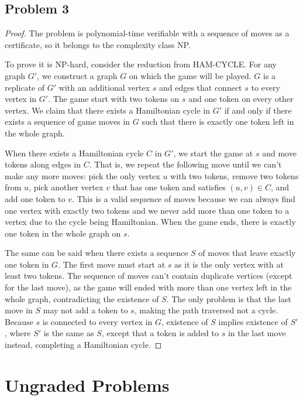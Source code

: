 \documentclass{article}
\begin{document}
\subsection*{Problem 3}

\begin{proof}
    The problem is polynomial-time verifiable with a sequence of moves as a certificate, so it belongs to the complexity class NP.
    
    To prove it is NP-hard, consider the reduction from HAM-CYCLE. For any graph $G'$, we construct a graph $G$ on which the game will be played. $G$ is a replicate of $G'$ with an additional vertex $s$ and edges that connect $s$ to every vertex in $G'$. The game start with two tokens on $s$ and one token on every other vertex. We claim that there exists a Hamiltonian cycle in $G'$ if and only if there exists a sequence of game moves in $G$ such that there is exactly one token left in the whole graph.

    When there exists a Hamiltonian cycle $C$ in $G'$, we start the game at $s$ and move tokens along edges in $C$. That is, we repeat the following move until we can't make any more moves: pick the only vertex $u$ with two tokens, remove two tokens from $u$, pick another vertex $v$ that has one token and satisfies $(u, v) \in C$, and add one token to $v$. This is a valid sequence of moves because we can always find one vertex with exactly two tokens and we never add more than one token to a vertex due to the cycle being Hamiltonian. When the game ends, there is exactly one token in the whole graph on $s$.

    The same can be said when there exists a sequence $S$ of moves that leave exactly one token in $G$. The first move must start at $s$ as it is the only vertex with at least two tokens. The sequence of moves can't contain duplicate vertices (except for the last move), as the game will ended with more than one vertex left in the whole graph, contradicting the existence of $S$. The only problem is that the last move in $S$ may not add a token to $s$, making the path traversed not a cycle. Because $s$ is connected to every vertex in $G$, existence of $S$ implies existence of $S'$, where $S'$ is the same as $S$, except that a token is added to $s$ in the last move instead, completing a Hamiltonian cycle.
\end{proof}

\section*{Ungraded Problems}
\end{document}
